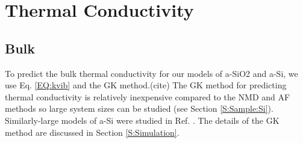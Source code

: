 \documentclass[aps,prb,twocolumn,superscriptaddress,footinbib,amsmath,amssymb,floatfix]{revtex4}
\begin{document}


\section{\label{S:Conductivity}Thermal Conductivity}

\subsection{\label{S:Bulk}Bulk}

To predict the bulk thermal conductivity for our models of a-SiO2 and 
a-Si, we use Eq. \eqref{EQ:kvib} 
and the GK method.(cite) The GK method for predicting 
thermal conductivity
is relatively inexpensive compared to the NMD and AF methods so  
large system sizes can be studied (see Section \ref{S:Sample:Si}).  
Similarly-large 
models of a-Si were studied in Ref. . The 
details of the GK method are discussed in Section \ref{S:Simulation}. 
\end{document}
